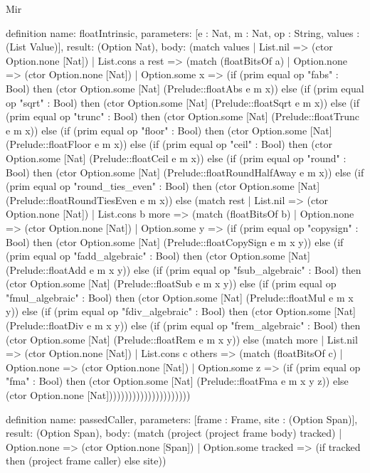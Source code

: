\begin{lexlean}{Mir}
\begin{semanticmodule}
definition{
  name: floatIntrinsic,
  parameters: [e : Nat, m : Nat, op : String, values : (List Value)],
  result: (Option Nat),
  body: (match values
    | List.nil => (ctor Option.none [Nat])
    | List.cons a rest => (match (floatBitsOf a)
      | Option.none => (ctor Option.none [Nat])
      | Option.some x => (if (prim equal op "fabs" : Bool) then (ctor Option.some [Nat] (Prelude::floatAbs e m x)) else (if (prim equal op "sqrt" : Bool) then (ctor Option.some [Nat] (Prelude::floatSqrt e m x)) else (if (prim equal op "trunc" : Bool) then (ctor Option.some [Nat] (Prelude::floatTrunc e m x)) else (if (prim equal op "floor" : Bool) then (ctor Option.some [Nat] (Prelude::floatFloor e m x)) else (if (prim equal op "ceil" : Bool) then (ctor Option.some [Nat] (Prelude::floatCeil e m x)) else (if (prim equal op "round" : Bool) then (ctor Option.some [Nat] (Prelude::floatRoundHalfAway e m x)) else (if (prim equal op "round_ties_even" : Bool) then (ctor Option.some [Nat] (Prelude::floatRoundTiesEven e m x)) else (match rest
        | List.nil => (ctor Option.none [Nat])
        | List.cons b more => (match (floatBitsOf b)
          | Option.none => (ctor Option.none [Nat])
          | Option.some y => (if (prim equal op "copysign" : Bool) then (ctor Option.some [Nat] (Prelude::floatCopySign e m x y)) else (if (prim equal op "fadd_algebraic" : Bool) then (ctor Option.some [Nat] (Prelude::floatAdd e m x y)) else (if (prim equal op "fsub_algebraic" : Bool) then (ctor Option.some [Nat] (Prelude::floatSub e m x y)) else (if (prim equal op "fmul_algebraic" : Bool) then (ctor Option.some [Nat] (Prelude::floatMul e m x y)) else (if (prim equal op "fdiv_algebraic" : Bool) then (ctor Option.some [Nat] (Prelude::floatDiv e m x y)) else (if (prim equal op "frem_algebraic" : Bool) then (ctor Option.some [Nat] (Prelude::floatRem e m x y)) else (match more
            | List.nil => (ctor Option.none [Nat])
            | List.cons c others => (match (floatBitsOf c)
              | Option.none => (ctor Option.none [Nat])
              | Option.some z => (if (prim equal op "fma" : Bool) then (ctor Option.some [Nat] (Prelude::floatFma e m x y z)) else (ctor Option.none [Nat])))))))))))))))))))))
}

definition{
  name: passedCaller,
  parameters: [frame : Frame, site : (Option Span)],
  result: (Option Span),
  body: (match (project (project frame body) tracked)
    | Option.none => (ctor Option.none [Span])
    | Option.some tracked => (if tracked then (project frame caller) else site))
}


\end{semanticmodule}
\end{lexlean}
